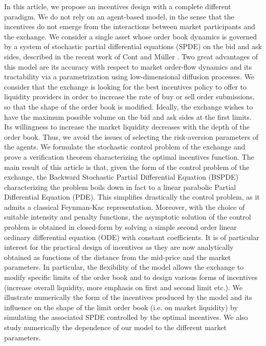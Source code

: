 \documentclass[11pt]{article}
\begin{document}
In this article, we propose an incentives design with a complete different paradigm. We do not rely on an agent-based model, in the sense that the incentives do not emerge from the interactions between market participants and the exchange. We consider a single asset whose order book dynamics is governed by a system of stochastic partial differential equations (SPDE) on the bid and ask sides, described in the recent work of Cont and Müller \cite{cont2021stochastic}. Two great advantages of this model are its accuracy with respect to market order-flow dynamics and its tractability via a parametrization using low-dimensional diffusion processes. We consider that the exchange is looking for the best incentives policy to offer to liquidity providers in order to increase the rate of buy or sell order submissions, so that the shape of the order book is modified. Ideally, the exchange wishes to have the maximum possible volume on the bid and ask sides at the first limits. Its willingness to increase the market liquidity decreases with the depth of the order book. Thus, we avoid the issues of selecting the risk-aversion parameters of the agents. We formulate the stochastic control problem of the exchange and prove a verification theorem characterizing the optimal incentives function. The main result of this article is that, given the form of the control problem of the exchange, the Backward Stochastic Partial Differential Equation (BSPDE) characterizing the problem boils down in fact to a linear parabolic Partial Differential Equation (PDE). This simplifies drastically the control problem, as it admits a classical Feynman-Kac representation. Moreover, with the choice of suitable intensity and penalty functions, the asymptotic solution of the control problem is obtained in closed-form by solving a simple second order linear ordinary differential equation (ODE) with constant coefficients. It is of particular interest for the practical design of incentives as they are now analytically obtained as functions of the distance from the mid-price and the market parameters. In particular, the flexibility of the model allows the exchange to modify specific limits of the order book and to design various forms of incentives (increase overall liquidity, more emphasis on first and second limit etc.). We illustrate numerically the form of the incentives produced by the model and its influence on the shape of the limit order book (i.e. on market liquidity) by simulating the associated SPDE controlled by the optimal incentives. We also study numerically the dependence of our model to the different market parameters.\\
\end{document}
